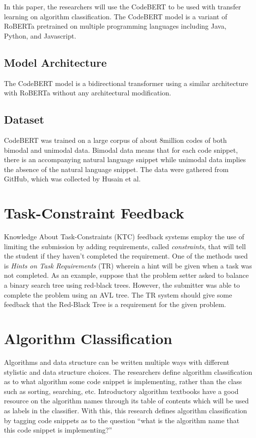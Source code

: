 In this paper, the researchers will use the CodeBERT\cite{feng2020codebert} 
to be used with transfer learning on algorithm classification. The CodeBERT 
model is a variant of RoBERTa pretrained on multiple programming languages 
including Java, Python, and Javascript.

\subsection{Model Architecture}

The CodeBERT model is a bidirectional transformer using a similar architecture 
with RoBERTa without any architectural modification.

\subsection{Dataset}

CodeBERT was trained on a large corpus of about 8million codes of both bimodal 
and unimodal data. Bimodal data means that for each code snippet, 
there is an accompanying natural language snippet while unimodal data 
implies the absence of the natural language snippet. The data were gathered from 
GitHub, which was collected by Husain et al\cite{husain2020codesearchnet}.

\section{Task-Constraint Feedback}

Knowledge About Task-Constraints (KTC) feedback systems employ the use of limiting 
the submission by adding requirements, called \textit{constraints}, that will tell the 
student if they haven’t completed the requirement.\cite{keuning2016towards} One of the methods used 
is \textit{Hints on Task Requirements} (TR) wherein a hint will be given when a task was 
not completed. As an example, suppose that the problem setter asked to balance a 
binary search tree using red-black trees. However, the submitter was able to 
complete the problem using an AVL tree. The TR system should give some feedback 
that the Red-Black Tree is a requirement for the given problem.

\section{Algorithm Classification}
Algorithms and data structure can be written multiple ways with different stylistic 
and data structure choices. The researchers define algorithm classification as to 
what algorithm some code snippet is implementing, rather than the class such as 
sorting, searching, etc. Introductory algorithm textbooks\cite{velivckovic2021clrs}\cite{skiena2020algorithm}\cite{sedgewick2011algorithms} 
have a good resource on the algorithm names through its table of contents which will 
be used as labels in the classifier. With this, this research defines algorithm 
classification by tagging code snippets as to the question “what is the algorithm 
name that this code snippet is implementing?” 

